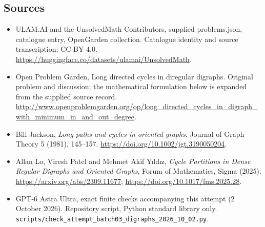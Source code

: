 \documentclass[11pt,a4paper]{article}
\begin{document}
\subsection{Sources}
\begin{itemize}
\item[S1] ULAM.AI and the UnsolvedMath Contributors, supplied problems.json, catalogue entry, OpenGarden collection. Catalogue identity and source transcription; CC BY 4.0.
\url{https://huggingface.co/datasets/ulamai/UnsolvedMath}.
\item[S2] Open Problem Garden, Long directed cycles in diregular digraphs. Original problem and discussion; the mathematical formulation below is expanded from the supplied source record.
\url{http://www.openproblemgarden.org/op/long_directed_cycles_in_digraph_with_minimum_in_and_out_degree}.
\item[S3] Bill Jackson, \emph{Long paths and cycles in oriented graphs}, Journal of Graph Theory 5 (1981), 145--157. \url{https://doi.org/10.1002/jgt.3190050204}.
\item[S4] Allan Lo, Viresh Patel and Mehmet Akif Y\i ld\i z, \emph{Cycle Partitions in Dense Regular Digraphs and Oriented Graphs}, Forum of Mathematics, Sigma (2025). \url{https://arxiv.org/abs/2309.11677}; \url{https://doi.org/10.1017/fms.2025.28}.
\item[S9] GPT-6 Astra Ultra, exact finite checks accompanying this attempt (2 October 2026). Repository script, Python standard library only. \texttt{scripts/check\_attempt\_batch03\_digraphs\_2026\_10\_02.py}.
\end{itemize}
\end{document}
